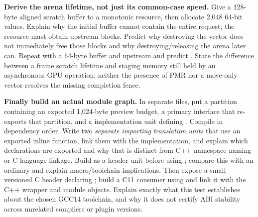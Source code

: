 \textbf{Derive the arena lifetime, not just its common-case speed.} Give a 128-byte aligned scratch buffer to a monotonic resource, then allocate 2,048 64-bit values. Explain why the initial buffer cannot contain the entire request; the resource must obtain upstream blocks. Predict why destroying the vector does not immediately free those blocks and why destroying/releasing the arena later can. Repeat with a 64-byte buffer and  upstream and predict . State the difference between a frame scratch lifetime and staging memory still held by an asynchronous GPU operation; neither the presence of PMR nor a move-only vector resolves the missing completion fence.

\textbf{Finally build an actual module graph.} In separate files, put a  partition containing an exported 1,024-byte preview budget, a primary  interface that re-exports that partition, and a  implementation unit defining . Compile in dependency order. Write two \emph{separate importing translation units} that use an exported inline function, link them with the implementation, and explain which declarations are exported and why that is distinct from C++ namespace naming or C language linkage. Build  as a header unit before using ; compare this with an ordinary  and explain macro/toolchain implications. Then expose a small versioned C header declaring ; build a C11 consumer using  and link it with the C++ wrapper and module objects. Explain exactly what this test establishes about the chosen GCC14 toolchain, and why it does not certify ABI stability across unrelated compilers or plugin versions.

